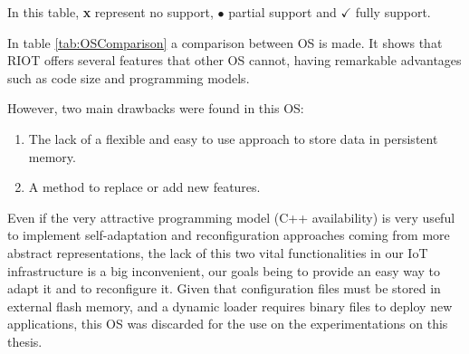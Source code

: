 In this table, \textbf{x} represent no support, $\bullet$ partial support and $\checkmark$ fully support.

In table \ref{tab:OSComparison} a comparison between OS is made.
It shows that RIOT offers several features that other OS cannot, having remarkable advantages such as code size and programming models.

However, two main drawbacks were found in this OS:
\begin{enumerate}
	\item The lack of a flexible and easy to use approach to store data in persistent memory.
	\item A method to replace or add new features.
\end{enumerate}

Even if the very attractive programming model (C++ availability) is very useful to implement self-adaptation and reconfiguration approaches coming from more abstract representations, the lack of this two vital functionalities in our IoT infrastructure is a big inconvenient, our goals being to provide an easy way to adapt it and to reconfigure it.
Given that configuration files must be stored in external flash memory, and a dynamic loader requires binary files to deploy new applications, this OS was discarded for the use on the experimentations on this thesis.




